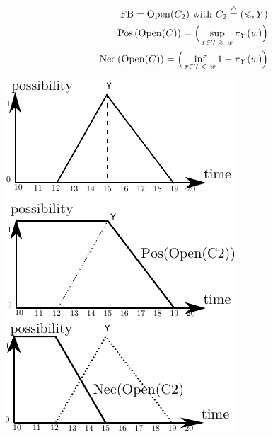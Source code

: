 \begin{eqnarray}
\nonumber
\operatorname{FB} = \operatorname{Open}(C_2) \mbox{ with } C_2\stackrel{\triangle}{=}\left(\leqslant,Y\right)\\
\nonumber
\operatorname{Pos}\left(\operatorname{Open}(C)\right) = \Big(\sup_{r\in\mathcal{T} \geqslant\  w}\pi_{Y}(w)\Big)\\
\nonumber
\operatorname{Nec}\left(\operatorname{Open}(C)\right) = \Big(\inf_{r\in\mathcal{T} <\  w}1-\pi_{Y}(w)\Big)
\end{eqnarray}


\vspace*{13pt}
\begin{center}
{
\includegraphics[scale=1]{./graphs/open-time-interval.pdf}
\label{fig:example-open-time-interval}
}
\end{center}
\vspace*{10pt}
\vspace*{13pt}





